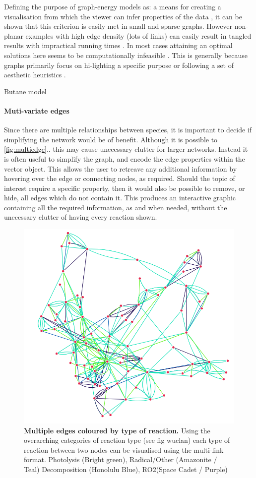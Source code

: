 Defining the purpose of graph-energy models as: a means for creating a visualisation from which the viewer can infer properties of the data \citep{noack}, it can be shown that this criterion is easily met in small and sparse graphs. However non-planar examples with high edge density (lots of links) can easily result in tangled results with impractical running times \citep{tvg}. In most cases attaining an optimal solutions here seems to be computationally infeasible \citep{nicelyanneal}. This is generally because graphs primarily focus on hi-lighting a specific purpose or following a set of aesthetic heuristics \citep{eyetrack}. 

Butane model 


\paragraph{Muti-variate edges}
Since there are multiple relationships between species, it is important to decide if simplifying the network would be of benefit. Although it is possible to \autoref{fig:multiedge}.. 
this may cause unecessary clutter for larger networks. Instead it is often useful to simplify the graph, and encode the edge properties within the vector object. This allows the user to retreave any additional information by hovering over the edge or connecting nodes, as required. Should the topic of interest require a specific property, then it would also be possible to remove, or hide, all edges which do not contain it. This produces an interactive graphic containing all the required information, as and when needed, without the unecessary clutter of having every reaction shown. 

\begin{figure}[H]
     \centering
     \includegraphics[width=.7\textwidth]{figures_c1/edgetype/multiquadratic.png}
        \caption{\textbf{Multiple edges coloured by type of reaction.} Using the overarching categories of reaction type (see fig wuclan) each type of reaction between two nodes can be visualised using the multi-link format. Photolysis (Bright green), Radical/Other (Amazonite / Teal) Decomposition (Honolulu Blue), RO2(Space Cadet / Purple)}
      \label{fig:multiedge}
\end{figure}

